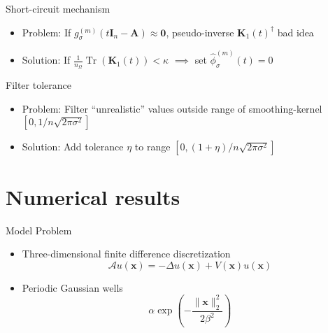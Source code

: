 \documentclass[aspectratio=169, leqno, 12pt]{beamer}
\newcommand{\mtx}[1]{\boldsymbol{#1}}
\newcommand{\vct}[1]{\boldsymbol{#1}}
\DeclareMathOperator{\Tr}{Tr}
\begin{document}
\begin{frame}{Short-circuit mechanism}
    \begin{itemize}
        \item Problem: If $g_{\sigma}^{(m)}(t\mtx{I}_n - \mtx{A}) \approx \mtx{0}$, pseudo-inverse $\mtx{K}_1(t)^{\dagger}$ bad idea
        \item Solution: If $\frac{1}{n_{\Omega}} \Tr(\mtx{K}_1(t)) < \kappa$ $\implies$ set $\widehat{\phi}_{\sigma}^{(m)}(t) = 0$
    \end{itemize}
    \centering
    \scalebox{0.8}{}
\end{frame}

\begin{frame}{Filter tolerance}
    \begin{itemize}
        \item Problem: Filter \enquote{unrealistic} values outside range of \gls{smoothing-kernel} $[0, 1/n\sqrt{2\pi\sigma^2}]$
        \item Solution: Add tolerance $\eta$ to range $[0, (1 + \eta)/n\sqrt{2\pi\sigma^2}]$
    \end{itemize}
    \centering
    \scalebox{0.8}{}
\end{frame}

\section{Numerical results}

\begin{frame}{Model Problem}
    \begin{itemize}
        \item Three-dimensional finite difference discretization \cite{lin2017randomized}
        \begin{equation}
            \mathcal{A} u(\vct{x}) = - \Delta u(\vct{x}) + V(\vct{x}) u(\vct{x})
        \end{equation}
        \item Periodic Gaussian wells
        \begin{equation}
            \alpha \exp(-\frac{\lVert \vct{x} \rVert _2^2}{ 2 \beta^2 })
        \end{equation}
    \end{itemize}
    \scalebox{0.85}{}
    \scalebox{0.85}{}
    \scalebox{0.85}{}
\end{frame}
\end{document}
